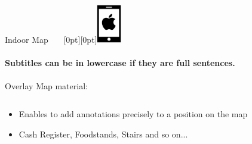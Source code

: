 \documentclass[11pt]{beamer}
\begin{document}
\begin{frame}{Indoor Map ~~~\raisebox{-10pt}[0pt][0pt]{\includegraphics[width=0.08\textwidth]{tech-stack-apple}}}

\framesubtitle{Subtitles can be in lowercase if they are full sentences.}
Overlay Map material:

  \begin{columns}[T]
  \begin{column}{.6\textwidth}
  \begin{itemize}
    \item Enables to add annotations precisely to a position on the map
    \item Cash Register, Foodstands, Stairs and so on...
  \end{itemize}
  \end{column}
  \begin{column}{.4\textwidth}

\end{column}
\end{columns}
\end{frame}
\end{document}
